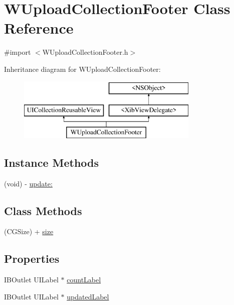 \hypertarget{interface_w_upload_collection_footer}{\section{W\-Upload\-Collection\-Footer Class Reference}
\label{interface_w_upload_collection_footer}
}


{\ttfamily \#import $<$W\-Upload\-Collection\-Footer.\-h$>$}

Inheritance diagram for W\-Upload\-Collection\-Footer\-:\begin{figure}[H]
\begin{center}
\leavevmode
\includegraphics[height=3.000000cm]{interface_w_upload_collection_footer}
\end{center}
\end{figure}
\subsection*{Instance Methods}
\begin{DoxyCompactItemize}
\item 
(void) -\/ \hyperlink{interface_w_upload_collection_footer_a1f17555f771b81e2aa155937868efc27}{update\-:}
\end{DoxyCompactItemize}
\subsection*{Class Methods}
\begin{DoxyCompactItemize}
\item 
(C\-G\-Size) + \hyperlink{interface_w_upload_collection_footer_a853ad8d2336fde39f24555b10a201584}{size}
\end{DoxyCompactItemize}
\subsection*{Properties}
\begin{DoxyCompactItemize}
\item 
I\-B\-Outlet U\-I\-Label $\ast$ \hyperlink{interface_w_upload_collection_footer_a26070c07f674fc97b8c8a5a1c7985c48}{count\-Label}
\item 
I\-B\-Outlet U\-I\-Label $\ast$ \hyperlink{interface_w_upload_collection_footer_add093d05ea9373e45275107472b7a78d}{updated\-Label}
\end{DoxyCompactItemize}


